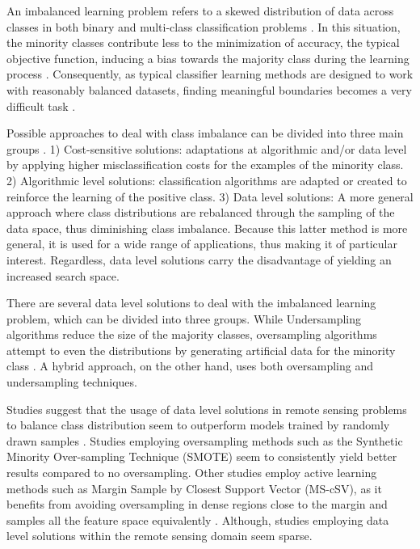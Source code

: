 \documentclass[parskip=full]{scrartcl}
\begin{document}
An imbalanced learning problem refers to a skewed distribution of data across
classes in both binary and multi-class classification problems \cite{Abdi2016}.
In this situation, the minority classes contribute less to the minimization of
accuracy, the typical objective function, inducing a bias towards the majority
class during the learning process \cite{Douzas2019}. Consequently, as typical
classifier learning methods are designed to work with reasonably balanced
datasets, finding meaningful boundaries becomes a very difficult task
\cite{Saez2016}.

Possible approaches to deal with class imbalance can be divided into three main
groups \cite{Fernandez2013}. 1) Cost-sensitive solutions: adaptations at
algorithmic and/or data level by applying higher misclassification costs for the
examples of the minority class. 2) Algorithmic level solutions: classification
algorithms are adapted or created to reinforce the learning of the positive
class. 3) Data level solutions: A more general approach where class
distributions are rebalanced through the sampling of the data space, thus
diminishing class imbalance. Because this latter method is more general, it is
used for a wide range of applications, thus making it of particular interest.
Regardless, data level solutions carry the disadvantage of yielding an increased
search space.

There are several data level solutions to deal with the imbalanced learning
problem, which can be divided into three groups. While Undersampling algorithms
reduce the size of the majority classes, oversampling algorithms attempt to
even the distributions by generating artificial data for the minority class
\cite{Mellor2015}. A hybrid approach, on the other hand, uses both oversampling
and undersampling techniques.

Studies suggest that the usage of data level solutions in remote sensing
problems to balance class distribution seem to outperform models
trained by randomly drawn samples \cite{Wang2019, Mellor2015}.  Studies
employing oversampling methods such as the Synthetic Minority Over-sampling
Technique (SMOTE) \cite{Chawla2002} seem to consistently yield better results
\cite{Johnson2013, Geib2015} compared to no oversampling. Other studies employ
active learning methods such as Margin Sample by Closest Support Vector
(MS-cSV), as it benefits from avoiding oversampling in dense regions close to
the margin and samples all the feature space equivalently \cite{Tuia2009}.
Although, studies employing data level solutions within the remote sensing
domain seem sparse.
\end{document}

